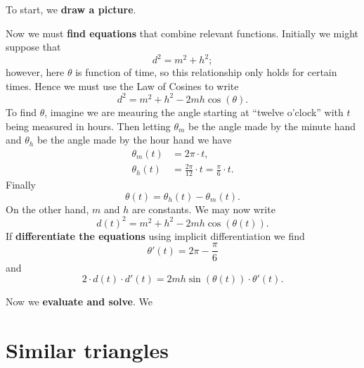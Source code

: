 \documentclass{ximera}
\begin{document}
\begin{example}
  \begin{explanation}
    To start, we \textbf{draw a picture}.
    \begin{image}
    \end{image}
    Now we must \textbf{find equations} that combine relevant
    functions. Initially we might suppose that
    \[
    d^2 = m^2 + h^2;
    \]
    however, here $\theta$ is function of time, so this relationship
    only holds for certain times. Hence we must use the Law of Cosines
    to write
    \[
    d^2 = m^2 + h^2 - 2mh\cos(\theta).
    \]
    To find $\theta$, imagine we are meauring the angle starting at
    ``twelve o'clock'' with $t$ being measured in hours. Then letting
    $\theta_m$ be the angle made by the minute hand and $\theta_h$ be
    the angle made by the hour hand we have
    \begin{align*}
    \theta_m(t) &= 2\pi \cdot t,\\
    \theta_h(t) &= \frac{2\pi}{12}\cdot t =\frac{\pi}{6}\cdot t.
    \end{align*}
    Finally
    \[
    \theta(t) = \theta_h(t) - \theta_m(t).
    \]
    On the other hand, $m$ and $h$ are constants. We may now write
    \[
    d(t)^2 = m^2 + h^2 - 2mh\cos(\theta(t)).
    \]
    If \textbf{differentiate the equations} using implicit
    differentiation we find
    \[
    \theta'(t) = 2\pi - \frac{\pi}{6}
    \]
    and
    \[
    2\cdot d(t) \cdot d'(t)  = 2mh\sin(\theta(t))\cdot \theta'(t).
    \]
    

    Now we \textbf{evaluate and solve}.  We


  \end{explanation}
\end{example}



\section{Similar triangles}
\end{document}
